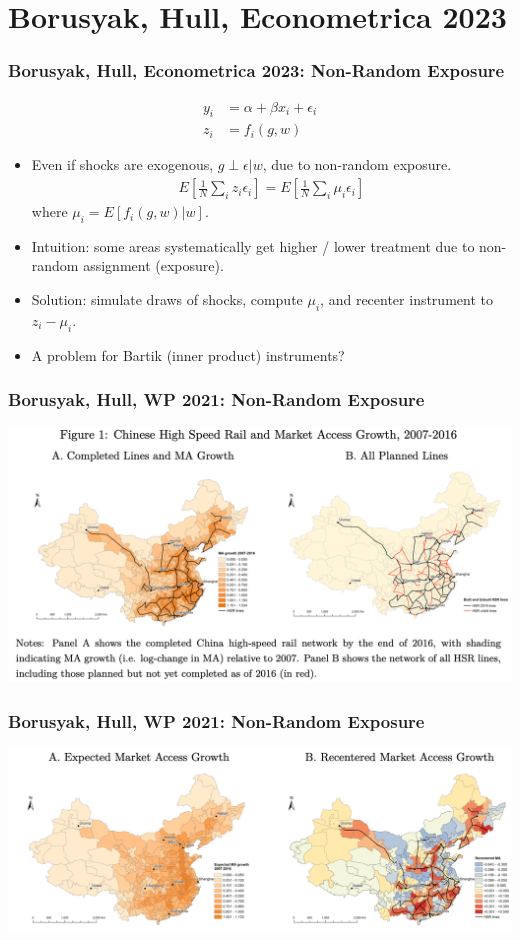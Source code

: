 \documentclass[english,xcolor=svgnames]{beamer}
\begin{document}
\section{Borusyak, Hull, Econometrica 2023}

\begin{frame}
\frametitle[alignment=center]{Borusyak, Hull, Econometrica 2023: Non-Random Exposure}
\begin{align*}
		y_i &= \alpha + \beta x_i + \epsilon_i \\
		z_i &= f_i(g,w)
	\end{align*}
\begin{itemize}
	\item Even if shocks are exogenous, $g \perp \epsilon | w$, due to non-random exposure.
\begin{align*}
	E\left[\frac{1}{N}\sum_i z_i \epsilon_i \right] = E\left[\frac{1}{N}\sum_i \mu_i \epsilon_i \right]
\end{align*}
where $\mu_i = E[f_i(g,w)|w]$.
\item Intuition: some areas systematically get higher / lower treatment due to non-random assignment (exposure).
\item Solution: simulate draws of shocks, compute $\mu_i$, and recenter instrument to $z_i-\mu_i$.
\item A problem for Bartik (inner product) instruments?
\end{itemize}
\end{frame}


\begin{frame}
\frametitle[alignment=center]{Borusyak, Hull, WP 2021: Non-Random Exposure}
\centering
\includegraphics[scale=0.5]{figures/BHFIG1.png}
\end{frame}

\begin{frame}
\frametitle[alignment=center]{Borusyak, Hull, WP 2021: Non-Random Exposure}
\centering
\includegraphics[scale=0.5]{figures/BHFIG2.png}
\end{frame}
\end{document}
